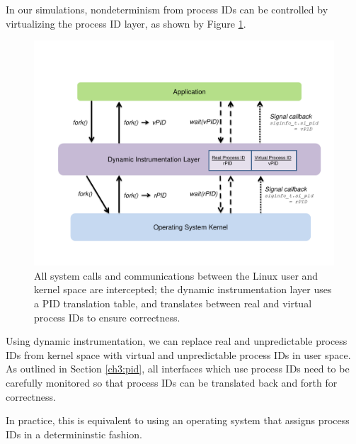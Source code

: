  \newline
In our simulations, nondeterminism from process IDs
can be controlled by virtualizing the process ID
layer, as shown by Figure \ref{ch3:pidfig}.

\begin{figure}[t]
  \center
  \includegraphics[trim=0cm 1cm 0cm 0.5cm, scale=0.60]{pid.pdf}
  \caption[Virtualizing the process ID layer using Pin]%
  {All system calls and communications
  between the Linux user and kernel space are intercepted; 
  the dynamic instrumentation layer
  uses a PID translation table, and
  translates between real and virtual process IDs
  to ensure correctness. }
  
  \label{ch3:pidfig}
\end{figure} 

Using dynamic instrumentation, we can replace
real and unpredictable process IDs from kernel space
with virtual and unpredictable process IDs in user space.
As outlined in Section \ref{ch3:pid}, all interfaces
which use process IDs need to be carefully monitored
so that process IDs can be translated back and forth
for correctness. 

In practice, this is equivalent
to using an operating system that assigns
process IDs in a determininstic fashion.



\newline

